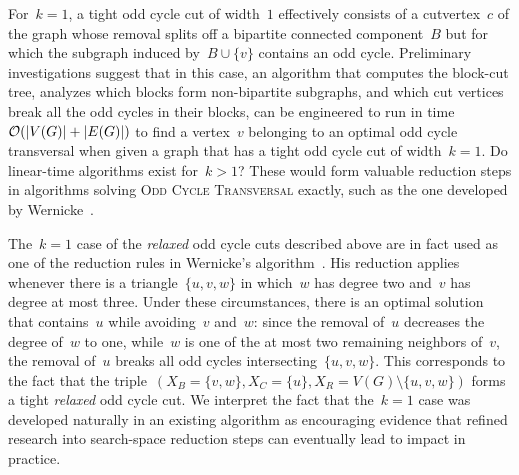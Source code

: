 For~$k=1$, a tight odd cycle cut of width~$1$ effectively consists of a cutvertex~$c$ of the graph whose removal splits off a bipartite connected component~$B$ but for which the subgraph induced by~$B \cup \{v\}$ contains an odd cycle. Preliminary investigations suggest that in this case, an algorithm that computes the block-cut tree, analyzes which blocks form non-bipartite subgraphs, and which cut vertices break all the odd cycles in their blocks, can be engineered to run in time~$\mathcal{O}(|V(G)| + |E(G)|)$ to find a vertex~$v$ belonging to an optimal odd cycle transversal when given a graph that has a tight odd cycle cut of width~$k=1$. Do linear-time algorithms exist for~$k>1$? These would form valuable reduction steps in algorithms solving \textsc{Odd Cycle Transversal} exactly, such as the one developed by Wernicke~\cite{Wernicke14}.

The~$k=1$ case of the \emph{relaxed} odd cycle cuts described above are in fact used as one of the reduction rules in Wernicke's algorithm~\cite[Rule 7]{Wernicke14}. His reduction applies whenever there is a triangle~$\{u,v,w\}$ in which~$w$ has degree two and~$v$ has degree at most three. Under these circumstances, there is an optimal solution that contains~$u$ while avoiding~$v$ and~$w$: since the removal of~$u$ decreases the degree of~$w$ to one, while~$w$ is one of the at most two remaining neighbors of~$v$, the removal of~$u$ breaks all odd cycles intersecting~$\{u,v,w\}$. This corresponds to the fact that the triple~$(X_B = \{v,w\}, X_C = \{u\}, X_R = V(G) \setminus \{u,v,w\})$ forms a tight \emph{relaxed} odd cycle cut. We interpret the fact that the~$k=1$ case was developed naturally in an existing algorithm as encouraging evidence that refined research into search-space reduction steps can eventually lead to impact in practice.